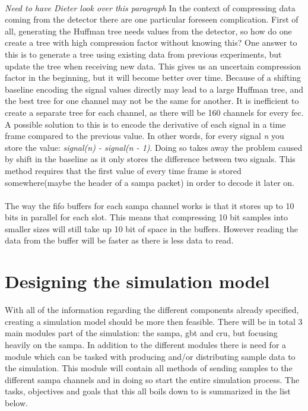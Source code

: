 \documentclass[a4paper, 12pt]{report}
\begin{document}
\paragraph{}
\textit{Need to have Dieter look over this paragraph}
In the context of compressing data coming from the detector there are one particular foreseen complication.
First of all, generating the Huffman tree needs values from the detector, so how do one create a tree with high compression factor without knowing this?
One answer to this is to generate a tree using existing data from previous experiments, but update the tree when receiving new data.
This gives us an uncertain compression factor in the beginning, but it will become better over time.
Because of a shifting baseline encoding the signal values directly may lead to a large Huffman tree, and the best tree for one channel may not be the same for another.
It is inefficient to create a separate tree for each channel, as there will be 160 channels for every \gls{fec}.
A possible solution to this is to encode the derivative of each signal in a time frame compared to the previous value.
In other words, for every signal \textit{n} you store the value: \textit{signal(n) - signal(n - 1)}.
Doing so takes away the problem caused by shift in the baseline as it only stores the difference between two signals.
This method requires that the first value of every time frame is stored somewhere(maybe the header of a \gls{sampa} packet) in order to decode it later on.


\paragraph{}
The way the \gls{fifo} buffers for each \gls{sampa} channel works is that it stores up to 10 bits in parallel for each slot.
This means that compressing 10 bit samples into smaller sizes will still take up 10 bit of space in the buffers. 
However reading the data from the buffer will be faster as there is less data to read.

\section{Designing the simulation model}
With all of the information regarding the different components already specified, creating a simulation model should be more then feasible.
There will be in total 3 main modules part of the simulation: the \gls{sampa}, \gls{gbt} and \gls{cru}, but focusing heavily on the \gls{sampa}.
In addition to the different modules there is need for a module which can be tasked with producing and/or distributing sample data to the simulation.
This module will contain all methods of sending samples to the different \gls{sampa} channels and in doing so start the entire simulation process.
The tasks, objectives and goals that this all boils down to is summarized in the list below.
\end{document}
